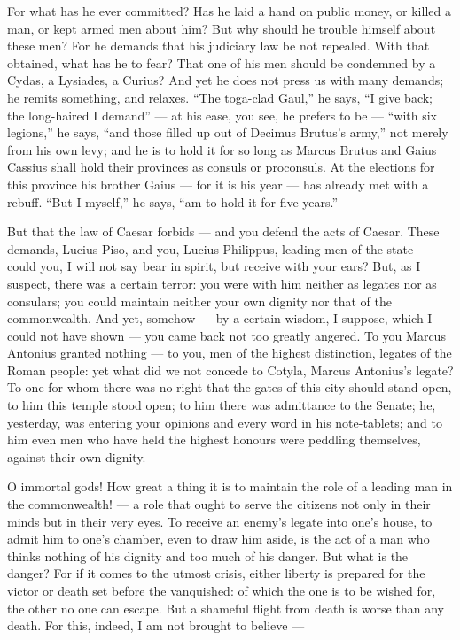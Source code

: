  For what has he ever committed? Has he laid a hand on public money, or killed a man, or kept armed men about him? But why should he trouble himself about these men? For he demands that his judiciary law be not repealed. With that obtained, what has he to fear? That one of his men should be condemned by a Cydas, a Lysiades, a Curius? And yet he does not press us with many demands; he remits something, and relaxes. ``The toga-clad Gaul,'' he says, ``I give back; the long-haired I demand'' --- at his ease, you see, he prefers to be --- ``with six legions,'' he says, ``and those filled up out of Decimus Brutus's army,'' not merely from his own levy; and he is to hold it for so long as Marcus Brutus and Gaius Cassius shall hold their provinces as consuls or proconsuls. At the elections for this province his brother Gaius --- for it is his year --- has already met with a rebuff. ``But I myself,'' he says, ``am to hold it for five years.''

 But that the law of Caesar forbids --- and you defend the acts of Caesar. These demands, Lucius Piso, and you, Lucius Philippus, leading men of the state --- could you, I will not say bear in spirit, but receive with your ears? But, as I suspect, there was a certain terror: you were with him neither as legates nor as consulars; you could maintain neither your own dignity nor that of the commonwealth. And yet, somehow --- by a certain wisdom, I suppose, which I could not have shown --- you came back not too greatly angered. To you Marcus Antonius granted nothing --- to you, men of the highest distinction, legates of the Roman people: yet what did we not concede to Cotyla, Marcus Antonius's legate? To one for whom there was no right that the gates of this city should stand open, to him this temple stood open; to him there was admittance to the Senate; he, yesterday, was entering your opinions and every word in his note-tablets; and to him even men who have held the highest honours were peddling themselves, against their own dignity.

 O immortal gods! How great a thing it is to maintain the role of a leading man in the commonwealth! --- a role that ought to serve the citizens not only in their minds but in their very eyes. To receive an enemy's legate into one's house, to admit him to one's chamber, even to draw him aside, is the act of a man who thinks nothing of his dignity and too much of his danger. But what is the danger? For if it comes to the utmost crisis, either liberty is prepared for the victor or death set before the vanquished: of which the one is to be wished for, the other no one can escape. But a shameful flight from death is worse than any death. For this, indeed, I am not brought to believe ---

